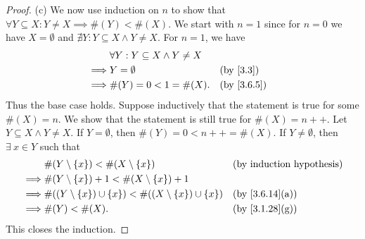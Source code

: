 \begin{proof}{(c)}
  We now use induction on \(n\) to show that \(\forall Y \subseteq X : Y \neq X \implies \#(Y) < \#(X)\).
  We start with \(n = 1\) since for \(n = 0\) we have \(X = \emptyset\) and \(\nexists Y : Y \subseteq X \land Y \neq X\).
  For \(n = 1\), we have
  \begin{align*}
             & \forall Y : Y \subseteq X \land Y \neq X                               \\
    \implies & Y = \emptyset                            &  & \text{(by \cref{3.3})}   \\
    \implies & \#(Y) = 0 < 1 = \#(X).                   &  & \text{(by \cref{3.6.5})}
  \end{align*}
  Thus the base case holds.
  Suppose inductively that the statement is true for some \(\#(X) = n\).
  We show that the statement is still true for \(\#(X) = n++\).
  Let \(Y \subseteq X \land Y \neq X\).
  If \(Y = \emptyset\), then \(\#(Y) = 0 < n++ = \#(X)\).
  If \(Y \neq \emptyset\), then \(\exists\ x \in Y\) such that
  \begin{align*}
             & \#(Y \setminus \{x\}) < \#(X \setminus \{x\})                           &  & \text{(by induction hypothesis)} \\
    \implies & \#(Y \setminus \{x\}) + 1 < \#(X \setminus \{x\}) + 1                                                         \\
    \implies & \#((Y \setminus \{x\}) \cup \{x\}) < \#((X \setminus \{x\}) \cup \{x\}) &  & \text{(by \cref{3.6.14}(a))}     \\
    \implies & \#(Y) < \#(X).                                                          &  & \text{(by \cref{3.1.28}(g))}
  \end{align*}
  This closes the induction.
\end{proof}

